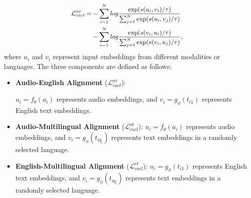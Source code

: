 \begin{equation}
\small
\begin{aligned}
\mathcal{L}^{uv}_{cacl}=&-\sum^N_{i=1}log\frac{\exp(s(u_i,v_i)/\tau)}{\sum^N_{j=1}\exp(s(u_i,v_j)/\tau)}\\
&-\sum^N_{i=1}log\frac{\exp(s(v_i,u_i)/\tau)}{\sum^N_{j=1}\exp(s(v_i,u_j)/\tau)},
\end{aligned}
\end{equation}
where $u_i$ and $v_i$ represent input embeddings from different modalities or languages. The three components are defined as follows:

\begin{itemize}
    \item \textbf{Audio-English Alignment} ($\mathcal{L}^{ae}_{cacl}$): 
    
    $u_i=f_\theta(a_i)$ represents audio embeddings, and $v_i=g_\phi(t_{i1})$ represents English text embeddings.
    \item \textbf{Audio-Multilingual Alignment} ($\mathcal{L}^{at}_{cacl}$): $u_i=f_\theta(a_i)$ represents audio embeddings, and $v_i=g_\phi(t_{iq_i})$ represents text embeddings in a randomly selected language.
    \item \textbf{English-Multilingual Alignment} ($\mathcal{L}^{et}_{cacl}$): $u_i=g_\phi(t_{i1})$ represents English text embeddings, and $v_i=g_\phi(t_{iq_i})$ represents text embeddings in a randomly selected language.
\end{itemize}




